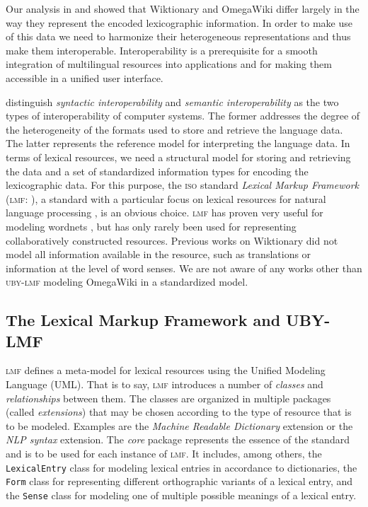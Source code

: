 \documentclass[output=paper]{LSP/langsci}
\begin{document}
Our analysis in  and  showed that Wiktionary and OmegaWiki differ largely in the way they represent the encoded lexicographic information. In order to make use of this data we need to harmonize their heterogeneous representations and thus make them interoperable.
Interoperability is a prerequisite for a smooth integration of multilingual resources into applications and for making them accessible in a unified user interface. 

\citet{Ide10} distinguish \emph{syntactic interoperability} and \emph{semantic interoperability} as the two types of interoperability of computer systems. The former addresses the degree of the heterogeneity of the formats used to store and retrieve the language data. The latter represents the reference model for interpreting the language data. In terms of lexical resources, we need a structural model for storing and retrieving the data and a set of standardized information types for encoding the lexicographic data. For this purpose, the \textsc{iso} standard \emph{Lexical Markup Framework} (\textsc{lmf}: \citealt{iso24613}), a standard with a particular focus on lexical resources for natural language processing \citep{Francopoulo2009}, is an obvious choice. \textsc{lmf} has proven very useful for modeling wordnets \citep{Soria09a,Henrich10a}, but has only rarely been used for representing collaboratively constructed resources. Previous works on Wiktionary \citep{McCrae12,Serasset12} did not model all information available in the 
resource, such as translations or information at the level of word senses. We are not aware of any works other than \textsc{uby-lmf} modeling OmegaWiki in a standardized model.

\subsection{The Lexical Markup Framework and UBY-LMF}

\textsc{lmf} defines a meta-model for lexical resources using the Unified Modeling Language (UML). That is to say, \textsc{lmf} introduces a number of \emph{classes} and \emph{relationships} between them. The classes are organized in multiple packages (called \emph{extensions}) that may be chosen according to the type of resource that is to be modeled. Examples are the \textit{Machine Readable Dictionary} extension or the \textit{\textsc{NLP} syntax} extension. The \textit{core} package represents the essence of the standard and is to be used for each instance of \textsc{lmf}. It includes, among others, the \texttt{LexicalEntry} class for modeling lexical entries in accordance to dictionaries, the \texttt{Form} class for representing different orthographic variants of a lexical entry, and the \texttt{Sense} class for modeling one of multiple possible meanings of a lexical entry.
\end{document}
